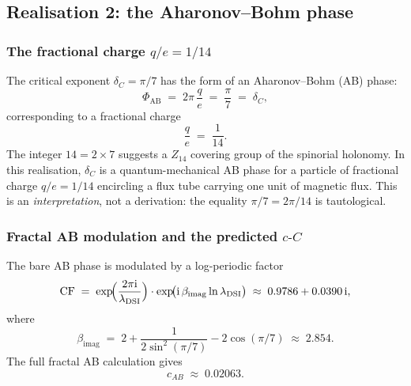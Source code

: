\documentclass[11pt,a4paper]{article}
\newcommand{\dC}{\delta_C}
\newcommand{\cC}{c\text{-}C}
\providecommand{\ii}{}
\renewcommand{\ii}{\mathrm{i}}
\theoremstyle{plain}
\theoremstyle{definition}
\theoremstyle{remark}
\begin{document}
\subsection{Realisation 2: the Aharonov--Bohm phase}
\label{ssec:ab}

\subsubsection{The fractional charge $q/e = 1/14$}

The critical exponent $\dC = \pi/7$ has the form of an
Aharonov--Bohm (AB) phase:
\begin{equation}\label{eq:ab-phase}
  \Phi_{\mathrm{AB}} \;=\; 2\pi\,\frac{q}{e} \;=\; \frac{\pi}{7}
                    \;=\; \dC,
\end{equation}
corresponding to a fractional charge
\begin{equation}
  \frac{q}{e} \;=\; \frac{1}{14}.
\end{equation}
The integer $14 = 2 \times 7$ suggests a $Z_{14}$ covering group of
the spinorial holonomy.  In this realisation, $\dC$ is a
quantum-mechanical AB phase for a particle of fractional charge
$q/e = 1/14$ encircling a flux tube carrying one unit of magnetic
flux.  This is an \emph{interpretation}, not a derivation: the
equality $\pi/7 = 2\pi/14$ is tautological.

\subsubsection{Fractal AB modulation and the predicted $\cC$}

The bare AB phase is modulated by a log-periodic factor
\begin{equation}\label{eq:complex-factor}
  \mathrm{CF}
   \;=\; \exp\!\Bigl(\frac{2\pi\ii}{\lambda_{\mathrm{DSI}}}\Bigr)
        \cdot \exp\!\bigl(\ii\,\beta_{\mathrm{imag}}
                          \ln\lambda_{\mathrm{DSI}}\bigr)
   \;\approx\; 0.9786 + 0.0390\,\ii,
\end{equation}
where
\begin{equation}
  \beta_{\mathrm{imag}}
    \;=\; 2 + \frac{1}{2\sin^2(\pi/7)} - 2\cos(\pi/7)
    \;\approx\; 2.854.
\end{equation}
The full fractal AB calculation gives
\begin{equation}\label{eq:c-AB}
  c_{AB} \;\approx\; 0.02063.
\end{equation}
\end{document}
